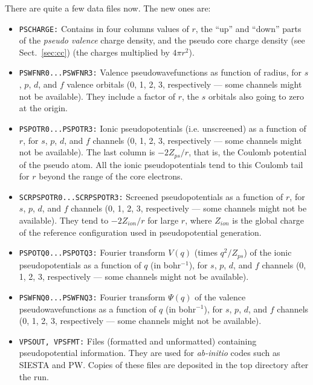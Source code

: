 \documentclass[11pt]{article}
\begin{document}
There are quite a few data files now. The new ones are:
\begin{itemize}

\item  {\tt PSCHARGE:} Contains in four
columns values of $r$, the ``up'' and ``down'' parts of the {\sl
pseudo valence} charge density, and the pseudo core charge density
(see Sect.~\ref{sec:cc}) (the charges
multiplied by $4\pi r^2$).

\item {\tt PSWFNR0...PSWFNR3:} Valence pseudowavefunctions as function
of radius, for $s$, $p$, $d$, and $f$ valence orbitals (0, 1, 2, 3,
respectively --- some channels might not be available). They include 
a factor of $r$, the $s$ orbitals also going to zero at the origin.

\item {\tt PSPOTR0...PSPOTR3:} Ionic pseudopotentials (i.e. unscreened)
as a function of $r$, for $s$, $p$, $d$, and $f$ channels (0, 1, 2, 3,
respectively --- some channels might not be available). The last
column is $-2Z_{ps}/r$, that is, the Coulomb potential of the pseudo
atom. All the ionic pseudopotentials tend to this Coulomb tail for $r$
beyond the range of the core electrons.

\item {\tt SCRPSPOTR0...SCRPSPOTR3:} Screened pseudopotentials
as a function of $r$, for $s$, $p$, $d$, and $f$ channels (0, 1, 2, 3,
respectively --- some channels might not be available). 
They tend to $-2Z_{ion}/r$ for large $r$, where $Z_{ion}$ is the
global charge of the reference configuration used in pseudopotential generation.

\item {\tt PSPOTQ0...PSPOTQ3:} Fourier transform $V(q)$ (times
$q^2/Z_{ps}$) of the ionic pseudopotentials as a function of $q$ (in
bohr$^{-1}$), for $s$, $p$, $d$, and $f$ channels (0, 1, 2, 3,
respectively --- some channels might not be available).

\item {\tt PSWFNQ0...PSWFNQ3:} Fourier transform $\Psi(q)$ of the 
valence pseudowavefunctions as a function of $q$ (in
bohr$^{-1}$), for $s$, $p$, $d$, and $f$ channels (0, 1, 2, 3,
respectively --- some channels might not be available).

\item {\tt VPSOUT, VPSFMT:} Files (formatted and unformatted)
containing pseudopotential information. They are used for {\it
ab-initio} codes such as {\sc SIESTA} and {\sc PW}. Copies of these
files are deposited in the top directory after the run.

\end{itemize}
\end{document}
